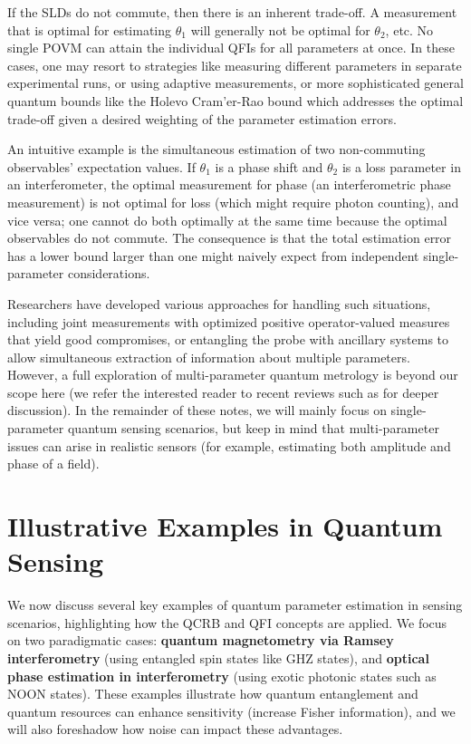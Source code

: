 If the SLDs do not commute, then there is an inherent trade-off. A measurement that is optimal for estimating $\theta_1$ will generally not be optimal for $\theta_2$, etc. No single POVM can attain the individual QFIs for all parameters at once. In these cases, one may resort to strategies like measuring different parameters in separate experimental runs, or using adaptive measurements, or more sophisticated general quantum bounds like the Holevo Cram'er-Rao bound \cite{Holevo2011} which addresses the optimal trade-off given a desired weighting of the parameter estimation errors.



An intuitive example is the simultaneous estimation of two non-commuting observables’ expectation values. If $\theta_1$ is a phase shift and $\theta_2$ is a loss parameter in an interferometer, the optimal measurement for phase (an interferometric phase measurement) is not optimal for loss (which might require photon counting), and vice versa; one cannot do both optimally at the same time because the optimal observables do not commute. The consequence is that the total estimation error has a lower bound larger than one might naively expect from independent single-parameter considerations.



Researchers have developed various approaches for handling such situations, including joint measurements with optimized positive operator-valued measures that yield good compromises, or entangling the probe with ancillary systems to allow simultaneous extraction of information about multiple parameters. However, a full exploration of multi-parameter quantum metrology is beyond our scope here (we refer the interested reader to recent reviews such as \cite{Ragy2016} for deeper discussion). In the remainder of these notes, we will mainly focus on single-parameter quantum sensing scenarios, but keep in mind that multi-parameter issues can arise in realistic sensors (for example, estimating both amplitude and phase of a field).



\section{Illustrative Examples in Quantum Sensing}

\label{sec:examples}



We now discuss several key examples of quantum parameter estimation in sensing scenarios, highlighting how the QCRB and QFI concepts are applied. We focus on two paradigmatic cases: \textbf{quantum magnetometry via Ramsey interferometry} (using entangled spin states like GHZ states), and \textbf{optical phase estimation in interferometry} (using exotic photonic states such as NOON states). These examples illustrate how quantum entanglement and quantum resources can enhance sensitivity (increase Fisher information), and we will also foreshadow how noise can impact these advantages.



